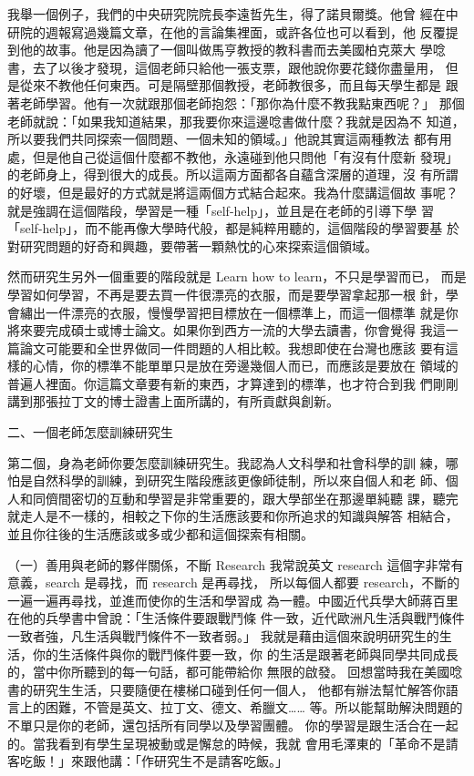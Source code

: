 我舉一個例子，我們的中央研究院院長李遠哲先生，得了諾貝爾獎。他曾
經在中研院的週報寫過幾篇文章，在他的言論集裡面，或許各位也可以看到，他
反覆提到他的故事。他是因為讀了一個叫做馬亨教授的教科書而去美國柏克萊大
學唸書，去了以後才發現，這個老師只給他一張支票，跟他說你要花錢你盡量用，
但是從來不教他任何東西。可是隔壁那個教授，老師教很多，而且每天學生都是
跟著老師學習。他有一次就跟那個老師抱怨：「那你為什麼不教我點東西呢？」
那個老師就說：「如果我知道結果，那我要你來這邊唸書做什麼？我就是因為不
知道，所以要我們共同探索一個問題、一個未知的領域。」他說其實這兩種教法
都有用處，但是他自己從這個什麼都不教他，永遠碰到他只問他「有沒有什麼新
發現」的老師身上，得到很大的成長。所以這兩方面都各自蘊含深層的道理，沒
有所謂的好壞，但是最好的方式就是將這兩個方式結合起來。我為什麼講這個故
事呢？就是強調在這個階段，學習是一種「self-help」，並且是在老師的引導下學
習「self-help」，而不能再像大學時代般，都是純粹用聽的，這個階段的學習要基
於對研究問題的好奇和興趣，要帶著一顆熱忱的心來探索這個領域。

然而研究生另外一個重要的階段就是 Learn how to learn，不只是學習而已，
而是學習如何學習，不再是要去買一件很漂亮的衣服，而是要學習拿起那一根
針，學會繡出一件漂亮的衣服，慢慢學習把目標放在一個標準上，而這一個標準
就是你將來要完成碩士或博士論文。如果你到西方一流的大學去讀書，你會覺得
我這一篇論文可能要和全世界做同一件問題的人相比較。我想即使在台灣也應該
要有這樣的心情，你的標準不能單單只是放在旁邊幾個人而已，而應該是要放在
領域的普遍人裡面。你這篇文章要有新的東西，才算達到的標準，也才符合到我
們剛剛講到那張拉丁文的博士證書上面所講的，有所貢獻與創新。


二、一個老師怎麼訓練研究生

第二個，身為老師你要怎麼訓練研究生。我認為人文科學和社會科學的訓
練，哪怕是自然科學的訓練，到研究生階段應該更像師徒制，所以來自個人和老
師、個人和同儕間密切的互動和學習是非常重要的，跟大學部坐在那邊單純聽
課，聽完就走人是不一樣的，相較之下你的生活應該要和你所追求的知識與解答
相結合，並且你往後的生活應該或多或少都和這個探索有相關。

（一）善用與老師的夥伴關係，不斷 Research
我常說英文 research 這個字非常有意義，search 是尋找，而 research 是再尋找，
所以每個人都要 research，不斷的一遍一遍再尋找，並進而使你的生活和學習成
為一體。中國近代兵學大師蔣百里在他的兵學書中曾說：「生活條件要跟戰鬥條
件一致，近代歐洲凡生活與戰鬥條件一致者強，凡生活與戰鬥條件不一致者弱。」
我就是藉由這個來說明研究生的生活，你的生活條件與你的戰鬥條件要一致，你
的生活是跟著老師與同學共同成長的，當中你所聽到的每一句話，都可能帶給你
無限的啟發。
回想當時我在美國唸書的研究生生活，只要隨便在樓梯口碰到任何一個人，
他都有辦法幫忙解答你語言上的困難，不管是英文、拉丁文、德文、希臘文……
等。所以能幫助解決問題的不單只是你的老師，還包括所有同學以及學習團體。
你的學習是跟生活合在一起的。當我看到有學生呈現被動或是懈怠的時候，我就
會用毛澤東的「革命不是請客吃飯！」來跟他講：「作研究生不是請客吃飯。」 

